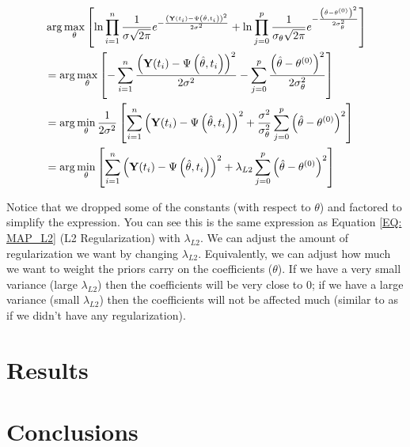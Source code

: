 \documentclass[a4paper,fleqn]{cas-dc}
\begin{document}
\begin{equation} \label{EQ: MAP_L2}
	\begin{split}
	&\arg\max_{\bf \theta} \left[ \ln \prod_{i=1}^{n} \frac{1}{\sigma\sqrt{2\pi}}e^{-\frac{ \left( \textbf{Y}(t_i) - \Psi\left( \hat{\theta}, t_i \right) \right)^2 }{2\sigma^2}}
	+ \ln \prod_{j=0}^{p} \frac{1}{\sigma_\theta\sqrt{2\pi}}e^{-\frac{ \left( \hat{\theta} - \theta^{(0)} \right)^2}{2\sigma_\theta^2}} \right]  \\
	&= \arg\max_{\bf \theta} \left[- \sum_{i=1}^{n} {\frac{\left( \textbf{Y}(t_i) - \Psi\left( \hat{\theta}, t_i \right) \right)^2}{2\sigma^2}}
	- \sum_{j=0}^{p} {\frac{\left( \hat{\theta} - \theta^{(0)} \right)^2}{2\sigma_\theta^2}} \right]\\
	&= \arg\min_{\bf \theta} \frac{1}{2\sigma^2} \left[ \sum_{i=1}^{n} \left( \textbf{Y}(t_i) - \Psi\left( \hat{\theta}, t_i \right) \right)^2
	+ \frac{\sigma^2}{\sigma_\theta^2} \sum_{j=0}^{p} \left( \hat{\theta} - \theta^{(0)} \right)^2 \right] \\
	&= \arg\min_{\bf \theta} \left[ \sum_{i=1}^{n} \left( \textbf{Y}(t_i) - \Psi\left( \hat{\theta}, t_i \right) \right)^2 + \lambda_{L2} \sum_{j=0}^{p} \left( \hat{\theta} - \theta^{(0)} \right)^2 \right]
	\end{split}
\end{equation}

Notice that we dropped some of the constants (with respect to $\theta$) and factored to simplify the expression. You can see this is the same expression as Equation \ref{EQ: MAP_L2} (L2 Regularization) with $\lambda_{L2}$. We can adjust the amount of regularization we want by changing $\lambda_{L2}$. Equivalently, we can adjust how much we want to weight the priors carry on the coefficients ($\theta$). If we have a very small variance (large $\lambda_{L2}$) then the coefficients will be very close to 0; if we have a large variance (small $\lambda_{L2}$) then the coefficients will not be affected much (similar to as if we didn't have any regularization).

\section{Results} \label{CH: Results}

\section{Conclusions}

\clearpage
%


\end{document}
